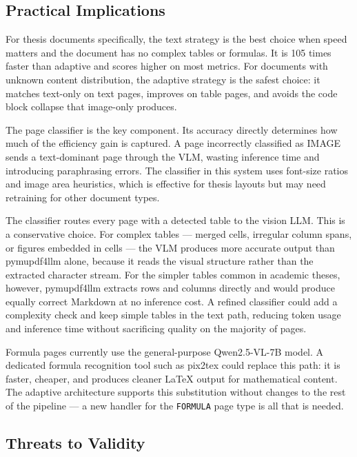 \documentclass[12pt]{article}
\begin{document}
\subsection{Practical Implications}

For thesis documents specifically, the text strategy is the best choice
when speed matters and the document has no complex tables or formulas.
It is 105 times faster than adaptive and scores higher on most metrics.
For documents with unknown content distribution, the adaptive strategy
is the safest choice: it matches text-only on text pages, improves on
table pages, and avoids the code block collapse that image-only produces.

The page classifier is the key component. Its accuracy directly
determines how much of the efficiency gain is captured. A page
incorrectly classified as IMAGE sends a text-dominant page through the
VLM, wasting inference time and introducing paraphrasing errors. The
classifier in this system uses font-size ratios and image area
heuristics, which is effective for thesis layouts but may need
retraining for other document types.

The classifier routes every page with a detected table to the vision LLM.
This is a conservative choice.
For complex tables --- merged cells, irregular column spans, or figures embedded
in cells --- the VLM produces more accurate output than pymupdf4llm alone, because
it reads the visual structure rather than the extracted character stream.
For the simpler tables common in academic theses, however, pymupdf4llm extracts
rows and columns directly and would produce equally correct Markdown at no
inference cost.
A refined classifier could add a complexity check and keep simple tables in the
text path, reducing token usage and inference time without sacrificing quality
on the majority of pages.

Formula pages currently use the general-purpose Qwen2.5-VL-7B model.
A dedicated formula recognition tool such as pix2tex could replace
this path: it is faster, cheaper, and produces cleaner LaTeX output
for mathematical content. The adaptive
architecture supports this substitution without changes to the rest of
the pipeline — a new handler for the \texttt{FORMULA} page type is
all that is needed.

\subsection{Threats to Validity}
\end{document}
